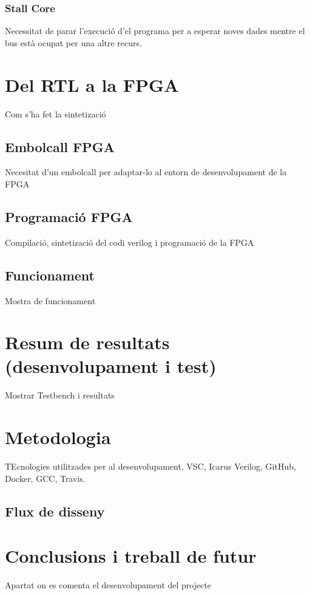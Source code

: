 \documentclass[10pt,a4paper,twocolumn,twoside]{article}
\begin{document}
        \subsubsection{Stall Core}
        Necessitat de parar l'execució d'el programa per a esperar noves dades mentre el bus està ocupat per una altre recurs.
        
        
\section{Del RTL a la FPGA}  %
Com s'ha fet la sintetizació 
    \subsection{Embolcall FPGA}
    Necesitat d'un embolcall per adaptar-lo al entorn de desenvolupament de la FPGA
    \subsection{Programació FPGA}
    Compilació, sintetizació del codi verilog i programació de la FPGA
    \subsection{Funcionament}
    Mostra de funcionament

\section{Resum de resultats (desenvolupament i test)}
Mostrar Testbench i resultats

\section{Metodologia}
TEcnologies utilitzades per al desenvolupament, VSC, Icarus Verilog, GitHub, Docker, GCC, Travis.
\subsection{Flux de disseny}  %
\section{Conclusions i treball de futur}  %
Apartat on es comenta el desenvolupament del projecte 
\end{document}
